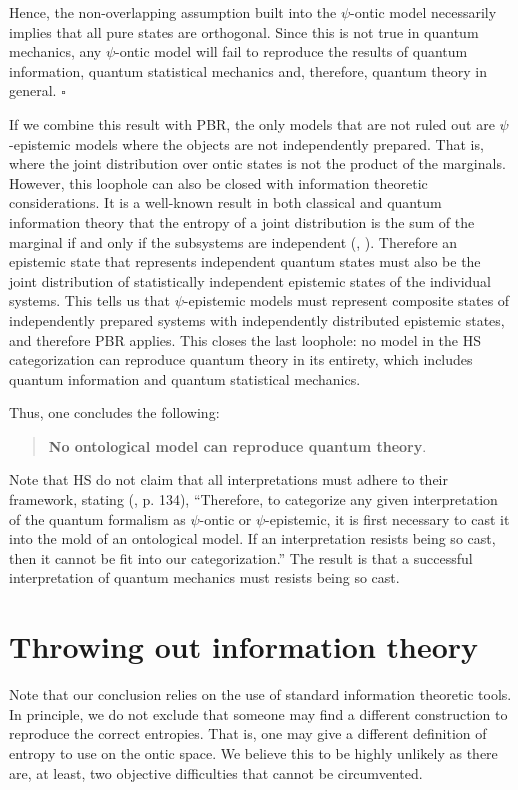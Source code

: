 \documentclass[10pt,twocolumn, nofootinbib]{revtex4-2}
\begin{document}
Hence, the non-overlapping assumption built into the $\psi$-ontic model necessarily implies that all pure states are orthogonal. Since this is not true in quantum mechanics, any $\psi$-ontic model will fail to reproduce the results of quantum information, quantum statistical mechanics and, therefore, quantum theory in general. $\square$

If we combine this result with PBR, the only models that are not ruled out are $\psi$-epistemic models where the objects are not independently prepared. That is, where the joint distribution over ontic states is not the product of the marginals. However, this loophole can also be closed with information theoretic considerations. It is a well-known result in both classical and quantum information theory that the entropy of a joint distribution is the sum of the marginal if and only if the subsystems are independent (\cite{Ash:2010}, \cite{Nielsen:2010}). Therefore an epistemic state that represents independent quantum states must also be the joint distribution of statistically independent epistemic states of the individual systems. This tells us that $\psi$-epistemic models must represent composite states of independently prepared systems with independently distributed epistemic states, and therefore PBR applies. This closes the last loophole: no model in the HS categorization can reproduce quantum theory in its entirety, which includes quantum information and quantum statistical mechanics.

Thus, one concludes the following:
\begin{quote}
	\textbf{No ontological model can reproduce quantum theory}.
\end{quote}
Note that HS do not claim that all interpretations must adhere to their framework, stating (\cite{Harrigan:2010}, p. 134), ``Therefore, to categorize any given interpretation of the quantum formalism as $\psi$-ontic or $\psi$-epistemic, it is first necessary to cast it into the mold of an ontological model. If an interpretation resists being so cast, then it cannot be fit into our categorization.'' The result is that a successful interpretation of quantum mechanics must resists being so cast.

\section{Throwing out information theory}

Note that our conclusion relies on the use of standard information theoretic tools. In principle, we do not exclude that someone may find a different construction to reproduce the correct entropies. That is, one may give a different definition of entropy to use on the ontic space. We believe this to be highly unlikely as there are, at least, two objective difficulties that cannot be circumvented.
\end{document}
